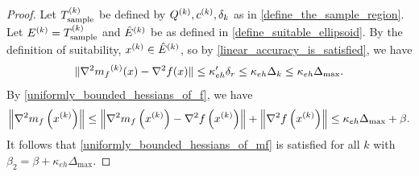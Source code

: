 \documentclass{article}
\begin{document}
\begin{proof}
Let ${T_{\text{sample}}^{(k)}}$ be defined by ${Q^{(k)}}, c^{(k)},\delta_k$ as in \cref{define_the_sample_region}.  Let ${E^{(k)}}={T_{\text{sample}}^{(k)}}$ and ${{\hat E}^{(k)}}$ be as defined in \cref{define_suitable_ellipsoid}.    By the definition of suitability, $x^{(k)} \in {{\hat E}^{(k)}}$, so by 
\cref{linear_accuracy_is_satisfied}, we have  
\[\|\nabla^2 {{m}_f}^{(k)}(x) - \nabla^2 f(x)\| \le \kappa_{eh}'\delta_r \le \kappa_{eh} \Delta_k \le \kappa_{eh}\Delta_{\text{max}}.\]
By \cref{uniformly_bounded_hessians_of_f},  we have
\begin{align*}
\left\|\nabla^2 m_{f}\left(x^{(k)}\right)\right\| \le \left\|\nabla^2 m_{f}\left(x^{(k)}\right) - \nabla^2 f\left(x^{(k)}\right)  \right\| + \left\|\nabla^2 f\left(x^{(k)}\right) \right\|
\le \kappa_{eh}\Delta_{\text{max}} + \beta .
\end{align*}
It follows that \cref{uniformly_bounded_hessians_of_mf} is satisfied for all $k$ with $\beta_2 = \beta+\kappa_{eh}\Delta_{\text{max}}$.
\end{proof}

\end{document}

